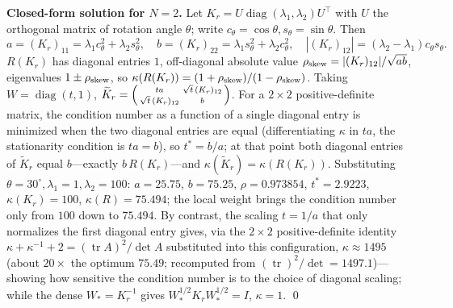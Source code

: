 \documentclass[11pt]{article}
\newcommand{\W}{W}
\DeclareMathOperator{\diag}{diag}
\DeclareMathOperator{\tr}{tr}
\numberwithin{equation}{section}
\begin{document}
\par\noindent\textbf{Closed-form solution for $N=2$.} Let $K_r=U\diag(\lambda_1,\lambda_2)U^\top$ with $U$ the orthogonal matrix of rotation angle $\theta$; write $c_\theta=\cos\theta,s_\theta=\sin\theta$. Then
\[
a=(K_r)_{11}=\lambda_1c_\theta^2+\lambda_2s_\theta^2,\quad
b=(K_r)_{22}=\lambda_1s_\theta^2+\lambda_2c_\theta^2,\quad
|(K_r)_{12}|=(\lambda_2-\lambda_1)c_\theta s_\theta.
\]
$R(K_r)$ has diagonal entries $1$, off-diagonal absolute value $\rho_{\rm skew}=|(K_r)_{12}|/\sqrt{ab}$, eigenvalues $1\pm\rho_{\rm skew}$, so $\kappa(R(K_r))=(1+\rho_{\rm skew})/(1-\rho_{\rm skew})$. Taking $\W=\diag(t,1)$, $\widetilde K_r=\begin{psmallmatrix}ta&\sqrt t\,(K_r)_{12}\\ \sqrt t\,(K_r)_{12}&b\end{psmallmatrix}$. For a $2\times2$ positive-definite matrix, the condition number as a function of a single diagonal entry is minimized when the two diagonal entries are equal (differentiating $\kappa$ in $ta$, the stationarity condition is $ta=b$), so $t^*=b/a$; at that point both diagonal entries of $\widetilde K_r$ equal $b$---exactly $b\,R(K_r)$---and $\kappa(\widetilde K_r)=\kappa(R(K_r))$. Substituting $\theta=30^\circ,\lambda_1=1,\lambda_2=100$: $a=25.75$, $b=75.25$, $\rho=0.973854$, $t^*=2.9223$, $\kappa(K_r)=100$, $\kappa(R)=75.494$; the local weight brings the condition number only from $100$ down to $75.494$. By contrast, the scaling $t=1/a$ that only normalizes the first diagonal entry gives, via the $2\times2$ positive-definite identity $\kappa+\kappa^{-1}+2=(\tr A)^2/\det A$ substituted into this configuration, $\kappa\approx1495$ (about $20\times$ the optimum $75.49$; recomputed from $(\tr)^2/\det=1497.1$)---showing how sensitive the condition number is to the choice of diagonal scaling; while the dense $\W_*=K_r^{-1}$ gives $\W_*^{1/2}K_r\W_*^{1/2}=I$, $\kappa=1$. \qed
\end{document}
